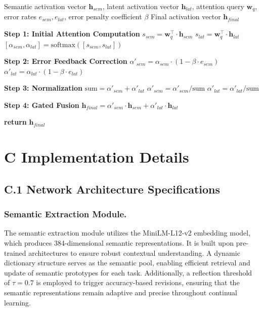 \documentclass[11pt]{article}
\begin{document}
\begin{algorithm}[h]
\caption{Adaptive Gated Fusion Mechanism}
\begin{algorithmic}[1]
\REQUIRE Semantic activation vector $\mathbf{h}_{sem}$, latent activation vector $\mathbf{h}_{lat}$, attention query $\mathbf{w}_q$, error rates $e_{sem}, e_{lat}$, error penalty coefficient $\beta$
\ENSURE Final activation vector $\mathbf{h}_{final}$

\STATE \textbf{Step 1: Initial Attention Computation}
\STATE $s_{sem} = \mathbf{w}_q^\top \cdot \mathbf{h}_{sem}$
\STATE $s_{lat} = \mathbf{w}_q^\top \cdot \mathbf{h}_{lat}$
\STATE $[\alpha_{sem}, \alpha_{lat}] = \text{softmax}([s_{sem}, s_{lat}])$

\STATE \textbf{Step 2: Error Feedback Correction}
\STATE $\alpha'_{sem} = \alpha_{sem} \cdot (1 - \beta \cdot e_{sem})$
\STATE $\alpha'_{lat} = \alpha_{lat} \cdot (1 - \beta \cdot e_{lat})$

\STATE \textbf{Step 3: Normalization}
\STATE $\text{sum} = \alpha'_{sem} + \alpha'_{lat}$
\STATE $\alpha'_{sem} = \alpha'_{sem} / \text{sum}$
\STATE $\alpha'_{lat} = \alpha'_{lat} / \text{sum}$

\STATE \textbf{Step 4: Gated Fusion}
\STATE $\mathbf{h}_{final} = \alpha'_{sem} \cdot \mathbf{h}_{sem} + \alpha'_{lat} \cdot \mathbf{h}_{lat}$

\STATE \textbf{return} $\mathbf{h}_{final}$
\end{algorithmic}
\end{algorithm}

\section*{C  Implementation Details}

\subsection*{C.1 Network Architecture Specifications}

\subsubsection*{Semantic Extraction Module.}
The semantic extraction module utilizes the MiniLM-L12-v2 embedding model, which produces 384-dimensional semantic representations. It is built upon pre-trained architectures to ensure robust contextual understanding. A dynamic dictionary structure serves as the semantic pool, enabling efficient retrieval and update of semantic prototypes for each task. Additionally, a reflection threshold of $\tau = 0.7$ is employed to trigger accuracy-based revisions, ensuring that the semantic representations remain adaptive and precise throughout continual learning.
\end{document}
